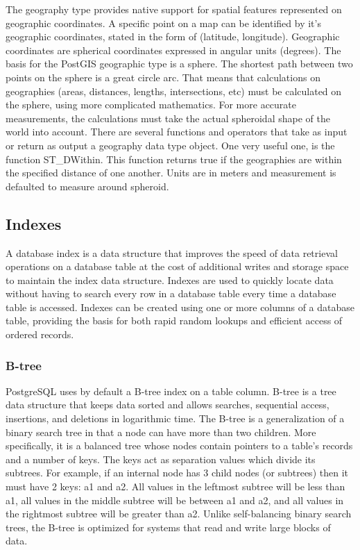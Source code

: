 The geography type provides native support for spatial features represented on geographic coordinates. A specific point on a map can be identified by it's 
geographic coordinates, stated in the form of (latitude, longitude). Geographic coordinates are spherical coordinates expressed in angular units (degrees). 
The basis for the PostGIS geographic type is a sphere. The shortest path between two points on the sphere is a great circle arc. That means that calculations 
on geographies (areas, distances, lengths, intersections, etc) must be calculated on the sphere, using more complicated mathematics. For more accurate 
measurements, the calculations must take the actual spheroidal shape of the world into account. There are several functions and operators 
that take as input or return as output a geography data type object. One very useful one, is the function ST\_DWithin. 
This function returns true if the geographies are within the specified distance of one another. Units are in meters and measurement is defaulted 
to measure around spheroid. 

\subsection{Indexes}

A database index is a data structure that improves the speed of data retrieval operations on a database table at the cost of additional writes and storage 
space to maintain the index data structure. Indexes are used to quickly locate data without having to search every row in a database table every time a database 
table is accessed. Indexes can be created using one or more columns of a database table, providing the basis for both rapid random lookups and efficient access 
of ordered records.

\subsubsection{B-tree}

PostgreSQL uses by default a B-tree index on a table column. B-tree \cite{13} is a tree data structure that keeps data sorted and allows searches, sequential access, 
insertions, and deletions in logarithmic time. The B-tree is a generalization of a binary search tree in that a node can have more than two children.
More specifically, it is a balanced tree whose nodes contain pointers to a table's records and a number of keys. The keys act as separation values which 
divide its subtrees. For example, if an internal node has 3 child nodes (or subtrees) then it must have 2 keys: a1 and a2. All values in the leftmost subtree 
will be less than a1, all values in the middle subtree will be between a1 and a2, and all values in the rightmost subtree will be greater than a2. 
Unlike self-balancing binary search trees, the B-tree is optimized for systems that read and write large blocks of data.

